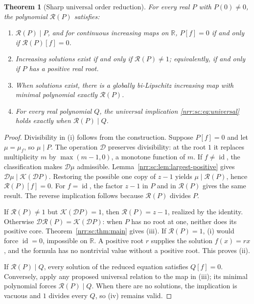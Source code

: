 \documentclass[11pt,letterpaper]{article}
\newtheorem{theorem}{Theorem}[section]
\theoremstyle{definition}
\theoremstyle{remark}
\newcommand{\R}{\mathbb R}
\newcommand{\id}{\operatorname{id}}
\newcommand{\scD}{\mathcal D}
\newcommand{\core}{\mathcal R}
\newcommand{\pcore}{\mathcal K}
\begin{document}
\begin{theorem}[Sharp universal order reduction]
\label{nrr:sc:thm:core}
For every real $P$ with $P(0)\ne0$, the polynomial $\core(P)$ satisfies:
\begin{enumerate}[label=\textnormal{(\roman*)},leftmargin=2.4em]
\item $\core(P)\mid P$, and for continuous increasing maps on $\R$,
$P[f]=0$ if and only if $\core(P)[f]=0$.
\item Increasing solutions exist if and only if $\core(P)\ne1$;
equivalently, if and only if $P$ has a positive real root.
\item When solutions exist, there is a globally bi-Lipschitz increasing
map with minimal polynomial exactly $\core(P)$.
\item For every real polynomial $Q$, the universal implication
\eqref{nrr:sc:eq:universal} holds exactly when $\core(P)\mid Q$.
\end{enumerate}
\end{theorem}
\begin{proof}
Divisibility in (i) follows from the construction. Suppose $P[f]=0$
and let $\mu=\mu_f$, so $\mu\mid P$. The operation $\scD$ preserves
divisibility: at the root $1$ it replaces multiplicity $m$ by
$\max(m-1,0)$, a monotone function of $m$.
If $f\ne\id$, the classification makes $\scD\mu$ admissible.
Lemma~\ref{nrr:sc:lem:largest-positive} gives
$\scD\mu\mid\pcore(\scD P)$. Restoring the possible one copy of $z-1$
yields $\mu\mid\core(P)$, hence $\core(P)[f]=0$.
For $f=\id$, the factor $z-1$ in $P$ and in $\core(P)$ gives the same result.
The reverse implication follows because $\core(P)$ divides $P$.

If $\core(P)\ne1$ but $\pcore(\scD P)=1$, then $\core(P)=z-1$,
realized by the identity. Otherwise
$\scD\core(P)=\pcore(\scD P)$: when $P$ has no root at one, neither does
its positive core. Theorem~\ref{nrr:sc:thm:main} gives (iii).
If $\core(P)=1$, (i) would force $\id=0$, impossible on $\R$.
A positive root $r$ supplies the solution $f(x)=rx$, and the formula has
no nontrivial value without a positive root. This proves (ii).

If $\core(P)\mid Q$, every solution of the reduced equation satisfies
$Q[f]=0$. Conversely, apply any proposed universal relation to the map
in (iii); its minimal polynomial forces $\core(P)\mid Q$.
When there are no solutions, the implication is vacuous and $1$ divides
every $Q$, so (iv) remains valid.
\end{proof}
\end{document}
